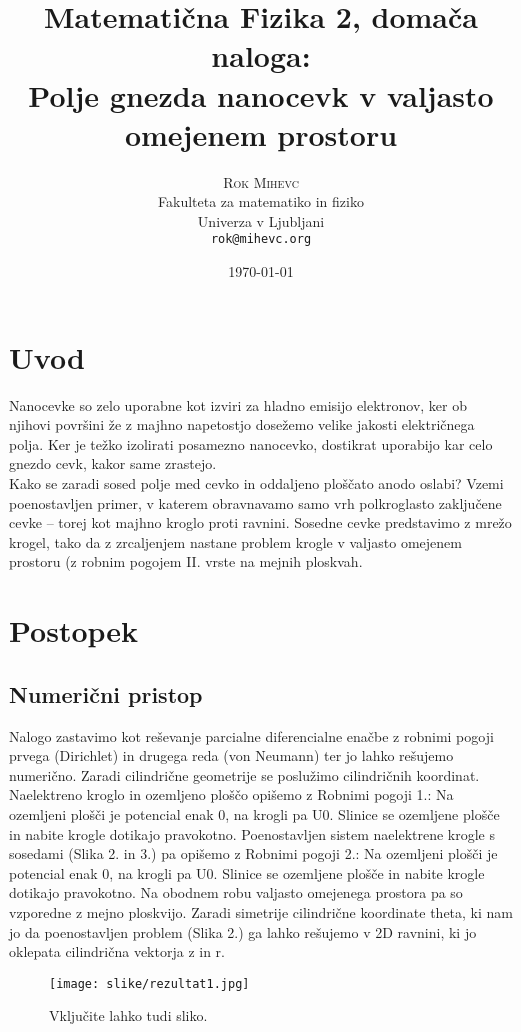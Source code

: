 \documentclass{article}[12pt]
\title{Matematična Fizika 2, domača naloga:\\
Polje gnezda nanocevk v valjasto omejenem prostoru}
\author{
     \textsc{Rok Mihevc} \\[0.25em]
     {\small{Fakulteta za matematiko in fiziko}} \\[-0.25em]
     {\small{Univerza v Ljubljani}} \\[-0.25em]
     {\small\texttt{rok@mihevc.org}}
     }
\date{\today}
\begin{document}
\maketitle


\section{Uvod}

Nanocevke so zelo uporabne kot izviri za hladno emisijo elektronov, ker ob njihovi površini že z majhno napetostjo dosežemo velike jakosti električnega polja. Ker je težko izolirati posamezno nanocevko, dostikrat uporabijo kar celo gnezdo cevk, kakor same zrastejo.\\
Kako se zaradi sosed polje med cevko in oddaljeno ploščato anodo oslabi? Vzemi poenostavljen primer, v katerem obravnavamo samo vrh polkroglasto zaključene cevke – torej kot majhno kroglo proti ravnini. Sosedne cevke predstavimo z mrežo krogel, tako da z zrcaljenjem nastane problem krogle v valjasto omejenem prostoru (z robnim pogojem II. vrste na mejnih ploskvah.

\section{Postopek}

\subsection{Numerični pristop}
Nalogo zastavimo kot reševanje parcialne diferencialne enačbe z robnimi pogoji prvega (Dirichlet) in
drugega reda (von Neumann) ter jo lahko rešujemo numerično. Zaradi cilindrične geometrije se 
poslužimo cilindričnih koordinat.
Naelektreno kroglo in ozemljeno ploščo opišemo z Robnimi pogoji 1.:
Na ozemljeni plošči je potencial enak 0, na krogli pa U0.
Slinice se ozemljene plošče in nabite krogle dotikajo pravokotno. 
Poenostavljen sistem naelektrene krogle s sosedami (Slika 2. in 3.) pa opišemo z Robnimi pogoji 2.:
Na ozemljeni plošči je potencial enak 0, na krogli pa U0.
Slinice se ozemljene plošče in nabite krogle dotikajo pravokotno. Na obodnem robu valjasto 
omejenega prostora pa so vzporedne z mejno ploskvijo.
Zaradi simetrije cilindrične koordinate theta, ki nam jo da poenostavljen problem (Slika 2.) ga lahko 
rešujemo v 2D ravnini, ki jo oklepata cilindrična vektorja z in r.

\begin{figure}[h]
\begin{center}
\texttt{[image: slike/rezultat1.jpg]}
\caption{Vključite lahko tudi sliko.}
\end{center}
\end{figure}
\end{document}
